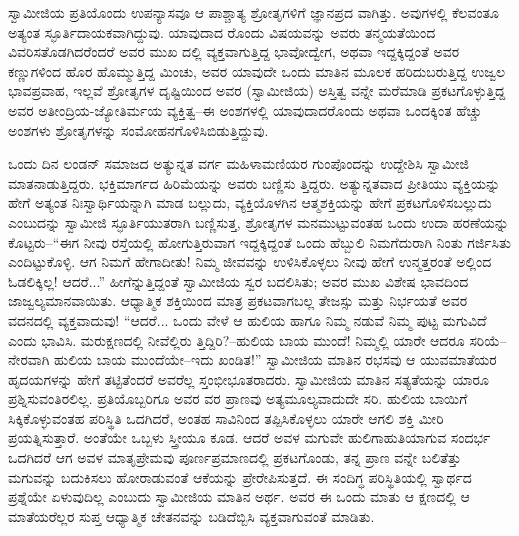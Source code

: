 ಸ್ವಾಮೀಜಿಯ ಪ್ರತಿಯೊಂದು ಉಪನ್ಯಾಸವೂ ಆ ಪಾಶ್ಚಾತ್ಯ ಶ್ರೋತೃಗಳಿಗೆ ಜ್ಞಾನಪ್ರದ ವಾಗಿತ್ತು. ಅವುಗಳಲ್ಲಿ ಕೆಲವಂತೂ ಅತ್ಯಂತ ಸ್ಫೂರ್ತಿದಾಯಕವಾಗಿದ್ದುವು. ಯಾವುದಾದ ರೊಂದು ವಿಷಯವನ್ನು ಅವರು ತನ್ಮಯತೆಯಿಂದ ವಿವರಿಸತೊಡಗಿದರೆಂದರೆ ಅವರ ಮುಖ ದಲ್ಲಿ ವ್ಯಕ್ತವಾಗುತ್ತಿದ್ದ ಭಾವೋದ್ವೇಗ, ಅಥವಾ ಇದ್ದಕ್ಕಿದ್ದಂತೆ ಅವರ ಕಣ್ಣುಗಳಿಂದ ಹೊರ ಹೊಮ್ಮುತ್ತಿದ್ದ ಮಿಂಚು, ಅವರ ಯಾವುದೇ ಒಂದು ಮಾತಿನ ಮೂಲಕ ಹರಿದುಬರುತ್ತಿದ್ದ ಉಜ್ವಲ ಭಾವಪ್ರವಾಹ, ಇಲ್ಲವೆ ಶ್ರೋತೃಗಳ ದೃಷ್ಟಿಯಿಂದ ಅವರ (ಸ್ವಾಮೀಜಿಯ) ಅಸ್ತಿತ್ವ ವನ್ನೇ ಮರೆಮಾಡಿ ಪ್ರಕಟಗೊಳ್ಳುತ್ತಿದ್ದ ಅವರ ಅತೀಂದ್ರಿಯ-ಜ್ಯೋತಿರ್ಮಯ ವ್ಯಕ್ತಿತ್ವ–ಈ ಅಂಶಗಳಲ್ಲಿ ಯಾವುದಾದರೊಂದು ಅಥವಾ ಒಂದಕ್ಕಿಂತ ಹೆಚ್ಚು ಅಂಶಗಳು ಶ್ರೋತೃಗಳನ್ನು ಸಂಮೋಹನಗೊಳಿಸಿಬಿಡುತ್ತಿದ್ದುವು.

ಒಂದು ದಿನ ಲಂಡನ್ ಸಮಾಜದ ಅತ್ಯುನ್ನತ ವರ್ಗ ಮಹಿಳಾಮಣಿಯರ ಗುಂಪೊಂದನ್ನು ಉದ್ದೇಶಿಸಿ ಸ್ವಾಮೀಜಿ ಮಾತನಾಡುತ್ತಿದ್ದರು. ಭಕ್ತಿಮಾರ್ಗದ ಹಿರಿಮೆಯನ್ನು ಅವರು ಬಣ್ಣಿಸು ತ್ತಿದ್ದರು. ಅತ್ಯುನ್ನತವಾದ ಪ್ರೀತಿಯು ವ್ಯಕ್ತಿಯನ್ನು ಹೇಗೆ ಅತ್ಯಂತ ನಿಃಸ್ವಾರ್ಥಿಯನ್ನಾಗಿ ಮಾಡ ಬಲ್ಲುದು, ವ್ಯಕ್ತಿಯೊಳಗಿನ ಆತ್ಮಶಕ್ತಿಯನ್ನು ಹೇಗೆ ಪ್ರಕಟಗೊಳಿಸಬಲ್ಲುದು ಎಂಬುದನ್ನು ಸ್ವಾಮೀಜಿ ಸ್ಫೂರ್ತಿಯುತರಾಗಿ ಬಣ್ಣಿಸುತ್ತ, ಶ್ರೋತೃಗಳ ಮನಮುಟ್ಟುವಂತಹ ಒಂದು ಉದಾ ಹರಣೆಯನ್ನು ಕೊಟ್ಟರು–“ಈಗ ನೀವು ರಸ್ತೆಯಲ್ಲಿ ಹೋಗುತ್ತಿರುವಾಗ ಇದ್ದಕ್ಕಿದ್ದಂತೆ ಒಂದು ಹೆಬ್ಬುಲಿ ನಿಮಗೆದುರಾಗಿ ನಿಂತು ಗರ್ಜಿಸಿತು ಎಂದಿಟ್ಟುಕೊಳ್ಳಿ. ಆಗ ನಿಮಗೆ ಹೇಗಾದೀತು! ನಿಮ್ಮ ಜೀವವನ್ನು ಉಳಿಸಿಕೊಳ್ಳಲು ನೀವು ಹೇಗೆ ಉನ್ಮತ್ತರಂತೆ ಅಲ್ಲಿಂದ ಓಡಲಿಕ್ಕಿಲ್ಲ! ಆದರೆ...” ಹೀಗೆನ್ನುತ್ತಿದ್ದಂತೆ ಸ್ವಾಮೀಜಿಯ ಸ್ವರ ಬದಲಿಸಿತು; ಅವರ ಮುಖ ವಿಶೇಷ ಭಾವದಿಂದ ಜಾಜ್ವಲ್ಯಮಾನವಾಯಿತು. ಆಧ್ಯಾತ್ಮಿಕ ಶಕ್ತಿಯಿಂದ ಮಾತ್ರ ಪ್ರಕಟವಾಗಬಲ್ಲ ತೇಜಸ್ಸು ಮತ್ತು ನಿರ್ಭಯತೆ ಅವರ ವದನದಲ್ಲಿ ವ್ಯಕ್ತವಾದುವು! “ಆದರೆ... ಒಂದು ವೇಳೆ ಆ ಹುಲಿಯ ಹಾಗೂ ನಿಮ್ಮ ನಡುವೆ ನಿಮ್ಮ ಪುಟ್ಟ ಮಗುವಿದೆ ಎಂದು ಭಾವಿಸಿ. ಮರುಕ್ಷಣದಲ್ಲಿ ನೀವೆಲ್ಲಿರು ತ್ತಿದ್ದಿರಿ?–ಹುಲಿಯ ಬಾಯ ಮುಂದೆ! ನಿಮ್ಮಲ್ಲಿ ಯಾರೇ ಆದರೂ ಸರಿಯೆ–ನೇರವಾಗಿ ಹುಲಿಯ ಬಾಯ ಮುಂದೆಯೇ–ಇದು ಖಂಡಿತ!” ಸ್ವಾಮೀಜಿಯ ಮಾತಿನ ರಭಸವು ಆ ಯುವಮಾತೆಯರ ಹೃದಯಗಳನ್ನು ಹೇಗೆ ತಟ್ಟಿತೆಂದರೆ ಅವರೆಲ್ಲ ಸ್ತಂಭೀಭೂತರಾದರು. ಸ್ವಾಮೀಜಿಯ ಮಾತಿನ ಸತ್ಯತೆಯನ್ನು ಯಾರೂ ಪ್ರಶ್ನಿಸುವಂತಿರಲಿಲ್ಲ. ಪ್ರತಿಯೊಬ್ಬರಿಗೂ ಅವರ ವರ ಪ್ರಾಣವು ಅತ್ಯಮೂಲ್ಯವಾದುದೇ ಸರಿ. ಹುಲಿಯ ಬಾಯಿಗೆ ಸಿಕ್ಕಿಕೊಳ್ಳುವಂತಹ ಪರಿಸ್ಥಿತಿ ಒದಗಿದರೆ, ಅಂತಹ ಸಾವಿನಿಂದ ತಪ್ಪಿಸಿಕೊಳ್ಳಲು ಯಾರೇ ಆಗಲಿ ಶಕ್ತಿ ಮೀರಿ ಪ್ರಯತ್ನಿಸುತ್ತಾರೆ. ಅಂತೆಯೇ ಒಬ್ಬಳು ಸ್ತ್ರೀಯೂ ಕೂಡ. ಆದರೆ ಅವಳ ಮಗುವೇ ಹುಲಿಗಾಹುತಿಯಾಗುವ ಸಂದರ್ಭ ಒದಗಿದರೆ ಆಗ ಅವಳ ಮಾತೃಪ್ರೇಮವು ಪೂರ್ಣಪ್ರಮಾಣದಲ್ಲಿ ಪ್ರಕಟಗೊಂಡು, ತನ್ನ ಪ್ರಾಣ ವನ್ನೇ ಬಲಿತೆತ್ತು ಮಗುವನ್ನು ಬದುಕಿಸಲು ಹೋರಾಡುವಂತೆ ಆಕೆಯನ್ನು ಪ್ರೇರೇಪಿಸುತ್ತದೆ. ಈ ಸಂದಿಗ್ಧ ಪರಿಸ್ಥಿತಿಯಲ್ಲಿ ಸ್ವಾರ್ಥದ ಪ್ರಶ್ನೆಯೇ ಏಳುವುದಿಲ್ಲ ಎಂಬುದು ಸ್ವಾಮೀಜಿಯ ಮಾತಿನ ಅರ್ಥ. ಅವರ ಈ ಒಂದು ಮಾತು ಆ ಕ್ಷಣದಲ್ಲಿ ಆ ಮಾತೆಯರೆಲ್ಲರ ಸುಪ್ತ ಆಧ್ಯಾತ್ಮಿಕ ಚೇತನವನ್ನು ಬಡಿದೆಬ್ಬಿಸಿ ವ್ಯಕ್ತವಾಗುವಂತೆ ಮಾಡಿತು.

